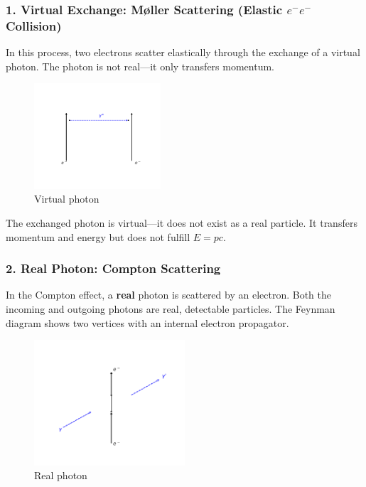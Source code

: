 \subsubsection*{1. Virtual Exchange: Møller Scattering (Elastic $e^-e^-$ Collision)}
In this process, two electrons scatter elastically through the exchange of a virtual photon. The photon is not real—it only transfers momentum.
\begin{figure}[H]
	\begin{center}
		\includegraphics[width=0.42\textwidth]{bilder/moeller-diagramm.pdf}
	\end{center}
	\caption{Virtual photon}
\end{figure}

\begin{tcolorbox}[physikbox, title=Virtual Photon]
	\label{box:virtuelles Photon}
	The exchanged photon is virtual—it does not exist as a real particle. It transfers momentum and energy but does not fulfill $E = pc$.
\end{tcolorbox}
\newpage
\noindent
\subsubsection*{2. Real Photon: Compton Scattering}
In the Compton effect, a \textbf{real} photon is scattered by an electron. Both the incoming and outgoing photons are real, detectable particles. The Feynman diagram shows two vertices with an internal electron propagator.

\begin{figure}[H]
	\begin{center}
		\includegraphics[width=0.5\textwidth]{bilder/compton-diagramm.pdf}
	\end{center}
	\caption{Real photon}
\end{figure}

